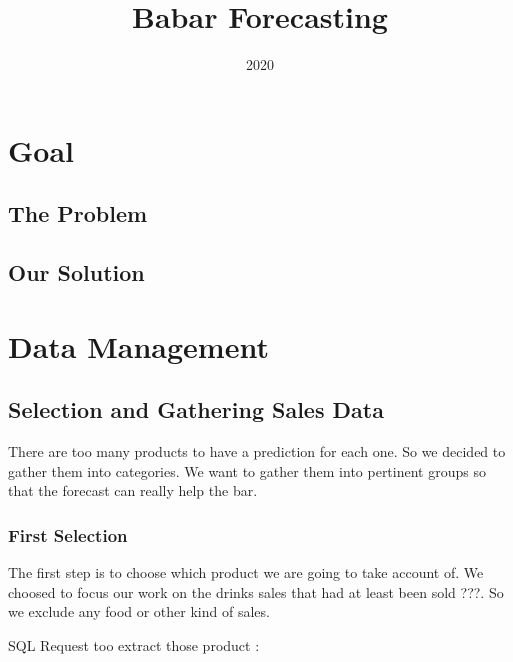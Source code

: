 \documentclass{report}
\title{Babar Forecasting}
\date{2020}
\begin{document}
\maketitle

\chapter{Goal}

\section{The Problem}

\section{Our Solution}

\chapter{Data Management}

\section{Selection and Gathering Sales Data}

There are too many products to have a prediction for each one. So we decided to gather them into categories. We want to gather them into pertinent groups so that the forecast can really help the bar.

\subsection{First Selection}

The first step is to choose which product we are going to take account of. We choosed to focus our work on the drinks sales that had at least been sold ???. So we exclude any food or other kind of sales.

SQL Request too extract those product : \\
 \\
\end{document}
